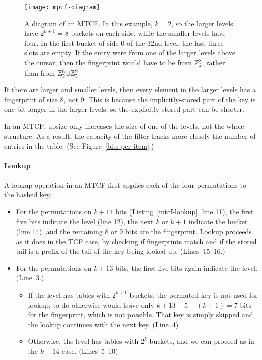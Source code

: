 \documentclass[letterpaper,twocolumn,10pt]{article}
\newcommand{\ints}{\mathbb{Z}}
\newcommand{\dotcup}{\ensuremath{\mathaccent\cdot\cup}}
\begin{document}
\begin{figure}
  \texttt{[image: mpcf-diagram]}
\caption{\label{mtcf-diagram}
A diagram of an MTCF.
In this example, $k = 2$, so the larger levels have $2^{k+1} = 8$ buckets on each side, while the smaller levels have four.
In the first bucket of side 0 of the 32nd level, the last three slots are empty.
If the entry were from one of the larger levels above the cursor, then the fingerprint would have to be from $\ints_2^8$, rather than from $\ints_2^8 \dotcup \ints_2^9$
}

\end{figure}

If there are larger and smaller levels, then every element in the larger levels has a fingerprint of size 8, not 9.
This is because the implicitly-stored part of the key is one-bit longer in the larger levels, so the explicitly stored part can be shorter.

In an MTCF, upsize only increases the size of one of the levels, not the whole structure.
As a result, the capacity of the filter tracks more closely the number of entries in the table. (See Figure~\ref{bits-per-item}.)

\paragraph{Lookup}
A lookup operation in an MTCF first applies each of the four permutations to the hashed key.
\begin{itemize}
\item For the permutations on $k + 14$ bits (Listing~\ref{mtcf-lookup}, line 11), the first five bits indicate the level (line 12), the next $k$ or $k+1$ indicate the bucket (line 14), and the remaining 8 or 9 bits are the fingerprint.
Lookup proceeds as it does in the TCF case, by checking if fingerprints match and if the stored tail is a prefix of the tail of the key being looked up. (Lines~15--16.)
\item For the permutations on $k + 13$ bits, the first five bits again indicate the level. (Line~3.)
\begin{itemize}
\item If the level has tables with $2^{k+1}$ buckets, the permuted key is not used for lookup; to do otherwise would leave only $k+13 - 5 - (k+1) = 7$ bits for the fingerprint, which is not possible.
That key is simply skipped and the lookup continues with the next key. (Line~4)
\item Otherwise, the level has tables with $2^k$ buckets, and we can proceed as in the $k+14$ case. (Lines~5--10)
\end{itemize}
\end{itemize}
\end{document}
